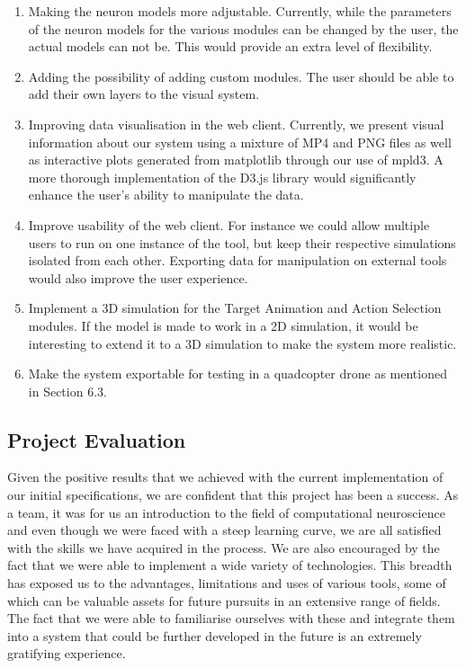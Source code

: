 \documentclass[a4paper,11pt]{article}
\begin{document}
\begin{enumerate}
\item Making the neuron models more adjustable. Currently, while the parameters of the neuron models for the various modules can be changed by the user, the actual models can not be. This would provide an extra level of flexibility.
\item Adding the possibility of adding custom modules. The user should be able to add their own layers to the visual system.
\item Improving data visualisation in the web client. Currently, we present visual information about our system using a mixture of MP4 and PNG files as well as interactive plots generated from matplotlib through our use of mpld3. A more thorough implementation of the D3.js library would significantly enhance the user's ability to manipulate the data.
\item Improve usability of the web client. For instance we could allow multiple users to run on one instance of the tool, but keep their respective simulations isolated from each other. Exporting data for manipulation on external tools would also improve the user experience.
\item Implement a 3D simulation for the Target Animation and Action Selection modules. If the model is made to work in a 2D simulation, it would be interesting to extend it to a 3D simulation to make the system more realistic.
\item Make the system exportable for testing in a quadcopter drone as mentioned in Section 6.3.
\end{enumerate}

\subsection{Project Evaluation}

Given the positive results that we achieved with the current implementation of our initial specifications,
we are confident that this project has been a success. As a team, it was for us an introduction to the field of
computational neuroscience and even though we were faced with a steep learning curve, we are all satisfied
with the skills we have acquired in the process. We are also encouraged by the fact that we were able to implement
a wide variety of technologies. This breadth has exposed us to the advantages, limitations and uses of various tools,
some of which can be valuable assets for future pursuits in an extensive range of fields. The fact that we were able
to familiarise ourselves with these and integrate them into a system that could be further developed in the
future is an extremely gratifying experience.
\end{document}
